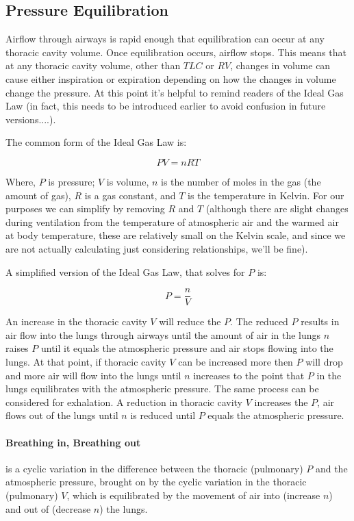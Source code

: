 \subsection{Pressure Equilibration} 
Airflow through airways is rapid enough that equilibration can occur at any thoracic cavity volume. Once equilibration occurs, airflow stops. This means that at any thoracic cavity volume, other than $TLC$ or $RV$, changes in volume can cause either inspiration or expiration depending on how the changes in volume change the pressure. At this point it's helpful to remind readers of the Ideal Gas Law (in fact, this needs to be introduced earlier to avoid confusion in future versions....). 

The common form of the Ideal Gas Law is: 

\begin{equation}
    PV = nRT
    \label{ideal_gas}
\end{equation}

Where, $P$ is pressure; $V$ is volume, $n$ is the number of moles in the gas (the amount of gas), $R$ is a gas constant, and $T$ is the temperature in Kelvin. For our purposes we can simplify by removing $R$ and $T$ (although there are slight changes during ventilation from the temperature of atmospheric air and the warmed air at body temperature, these are relatively small on the Kelvin scale, and since we are not actually calculating just considering relationships, we'll be fine).

A simplified version of the Ideal Gas Law, that solves for $P$ is:

\begin{equation}
    P = \frac{n}{V}
\end{equation}

An increase in the thoracic cavity $V$ will reduce the $P$. The reduced $P$ results in air flow into the lungs through airways until the amount of air in the lungs $n$ raises $P$ until it equals the atmospheric pressure and air stops flowing into the lungs. At that point, if thoracic cavity $V$ can be increased more then $P$ will drop and more air will flow into the lungs until $n$ increases to the point that $P$ in the lungs equilibrates with the atmospheric pressure. 
The same process can be considered for exhalation. A reduction in thoracic cavity $V$ increases the $P$, air flows out of the lungs until $n$ is reduced until $P$ equals the atmospheric pressure. 

\paragraph{Breathing in, Breathing out} is a cyclic variation in the difference between the thoracic (pulmonary) $P$ and the atmospheric pressure, brought on by the cyclic variation in the thoracic (pulmonary) $V$, which is equilibrated by the movement of air into (increase $n$) and out of (decrease $n$) the lungs.

